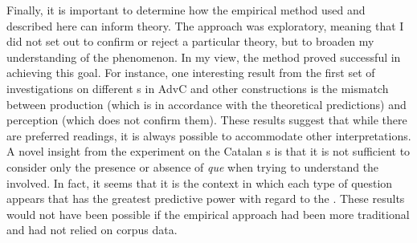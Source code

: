 Finally, it is important to determine how the empirical method used and described here can inform  theory. The  approach was exploratory, meaning that  I did not set out to confirm or reject a particular theory, but to broaden my understanding of the phenomenon.  In my view, the method proved successful in achieving this goal. For instance, one interesting result from the first set of investigations on different s in AdvC and other constructions is the mismatch between production (which is in accordance with the theoretical predictions) and perception (which does not confirm them). These results suggest that while there are preferred readings, it is always possible to accommodate  other interpretations. A novel insight from the experiment on the Catalan s is that it is not sufficient to consider only the presence or absence of \emph{que} when trying to understand the  involved. In fact, it seems that it is the context in which each type of question appears that has the greatest predictive power with regard to the . These results would not have been possible if the empirical approach had been more traditional and had not relied on corpus data. 
